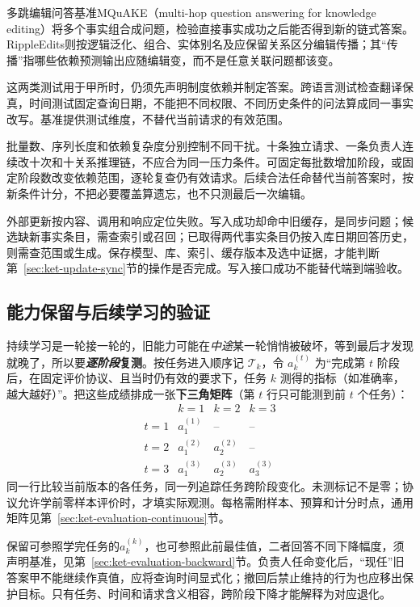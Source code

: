 多跳编辑问答基准MQuAKE（multi-hop question answering for knowledge editing）将多个事实组合成问题，检验直接事实成功之后能否得到新的链式答案。RippleEdits则按逻辑泛化、组合、实体别名及应保留关系区分编辑传播；其“传播”指哪些依赖预测输出应随编辑变，而不是任意关联问题都该变。

这两类测试用于甲所时，仍须先声明制度依赖并制定答案。跨语言测试检查翻译保真，时间测试固定查询日期，不能把不同权限、不同历史条件的问法算成同一事实改写。基准提供测试维度，不替代当前请求的有效范围。

批量数、序列长度和依赖复杂度分别控制不同干扰。十条独立请求、一条负责人连续改十次和十关系推理链，不应合为同一压力条件。可固定每批数增加阶段，或固定阶段数改变依赖范围，逐轮复查仍有效请求。后续合法任命替代当前答案时，按新条件计分，不把必要覆盖算遗忘，也不只测最后一次编辑。

外部更新按内容、调用和响应定位失败。写入成功却命中旧缓存，是同步问题；候选缺新事实条目，需查索引或召回；已取得两代事实条目仍按入库日期回答历史，则需查范围或生成。保存模型、库、索引、缓存版本及选中证据，才能判断第~\ref{sec:ket-update-sync}节的操作是否完成。写入接口成功不能替代端到端验收。

\subsection{能力保留与后续学习的验证}
\label{sec:ket-update-retention-validation}

持续学习是一轮接一轮的，旧能力可能在\emph{中途}某一轮悄悄被破坏，等到最后才发现就晚了，所以要\textbf{\emph{逐阶段}复测}。按任务进入顺序记 $\mathcal T_k$，令 $a_k^{(t)}$ 为“完成第 $t$ 阶段后，在固定评价协议、且当时仍有效的要求下，任务 $k$ 测得的指标（如准确率，越大越好）”。把这些成绩排成一张\textbf{下三角矩阵}（第 $t$ 行只可能测到前 $t$ 个任务）：
\[
\begin{array}{c|ccc}
 & k=1 & k=2 & k=3\\ \hline
t=1&a_1^{(1)}&\text{--}&\text{--}\\
t=2&a_1^{(2)}&a_2^{(2)}&\text{--}\\
t=3&a_1^{(3)}&a_2^{(3)}&a_3^{(3)}
\end{array}
\]
同一行比较当前版本的各任务，同一列追踪任务跨阶段变化。未测标记不是零；协议允许学前零样本评价时，才填实际观测。每格需附样本、预算和计分时点，通用矩阵见第~\ref{sec:ket-evaluation-continuous}节。

保留可参照学完任务的$a_k^{(k)}$，也可参照此前最佳值，二者回答不同下降幅度，须声明基准，见第~\ref{sec:ket-evaluation-backward}节。负责人任命变化后，“现任”旧答案甲不能继续作真值，应将查询时间显式化；撤回后禁止维持的行为也应移出保护目标。只有任务、时间和请求含义相容，跨阶段下降才能解释为对应退化。

